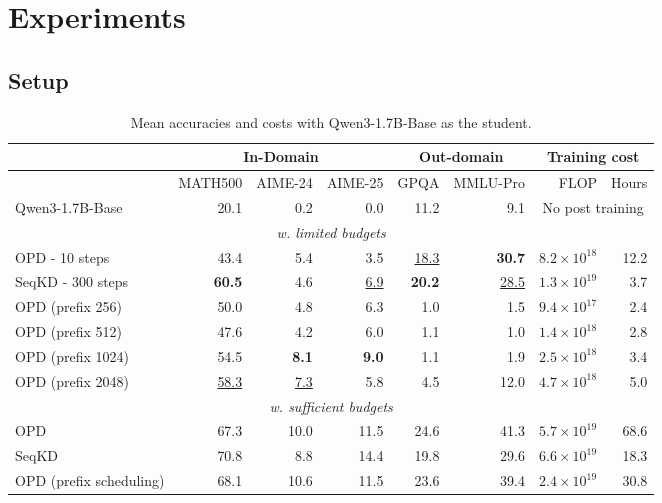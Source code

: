 \documentclass[11pt]{article}
\begin{document}
  
\section{Experiments}  



  
\subsection{Setup}  
  


\begin{table}[h!]  
\centering  
\small  
\begin{tabular}{l|r|r|r||r|r||r|r}  
\hline  
 & \multicolumn{3}{c||}{In-Domain}   & \multicolumn{2}{c||}{Out-domain} &\multicolumn{2}{c}{Training cost}  \\ 
\hline  
 & {\scriptsize MATH500} & {\scriptsize AIME-24} & {\scriptsize AIME-25}   & {\scriptsize GPQA} & {\scriptsize MMLU-Pro} & FLOP & Hours \\  

\hline  
Qwen3-1.7B-Base    & 20.1 &  0.2 &  0.0 & 11.2  & 9.1 & \multicolumn{2}{c}{No post training}  \\  
\hline
\multicolumn{8}{c}{\emph{w. limited budgets}} \\
\hline
OPD - 10 steps      & 43.4 & 5.4 & 3.5 & \underline{18.3} & \textbf{30.7} & $8.2\times 10^{18}$ &  12.2 \\ 
SeqKD - 300 steps          & \textbf{60.5} & 4.6 & \underline{6.9} & \textbf{20.2} &  \underline{28.5} & $1.3\times 10^{19}$  & 3.7 \\ 
\hline
\hline
OPD (prefix 256)       & 50.0 & 4.8 & 6.3  & 1.0 & 1.5 & $9.4\times 10^{17}$ & 2.4 \\ 
OPD (prefix 512)       & 47.6 & 4.2  & 6.0 & 1.1 & 1.0 & $1.4\times 10^{18}$  & 2.8 \\ 
OPD (prefix 1024)      & 54.5 & \textbf{8.1} & \textbf{9.0} & 1.1 & 1.9 & $2.5\times 10^{18}$ & 3.4 \\ 
OPD (prefix 2048)      & \underline{58.3} & \underline{7.3} & 5.8 & 4.5 & 12.0 &  $4.7\times 10^{18}$ & 5.0 \\ 
\hline
\hline
\multicolumn{8}{c}{\emph{w. sufficient budgets}} \\
\hline
OPD   & 67.3 & 10.0  & 11.5 & 24.6 & 41.3 & $5.7\times 10^{19}$ & 68.6  \\ 
SeqKD        & 70.8 & 8.8 & 14.4  &  19.8 & 29.6 & $6.6\times 10^{19}$  & 18.3 \\ 
\hline
OPD (prefix scheduling)    & 68.1 & 10.6  & 11.5 & 23.6 & 39.4 & $2.4\times 10^{19}$  & 30.8 \\ 
\hline  
\end{tabular}  
\caption{Mean accuracies and costs with Qwen3-1.7B-Base as the student.}
\label{tab:main result 1.7b}  
\end{table}  
\end{document}
